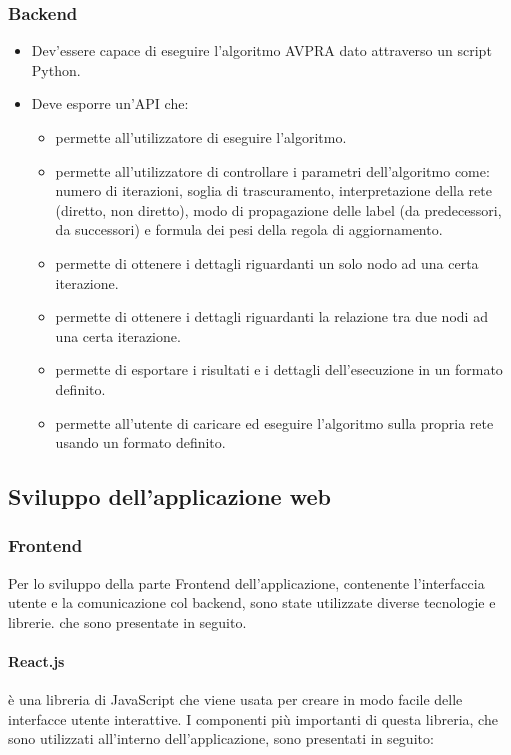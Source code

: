 \documentclass[a4paper,12pt]{report}
\begin{document}
			\subsubsection{Backend}
			\begin{itemize}
				\item Dev'essere capace di eseguire l'algoritmo AVPRA dato attraverso un script Python.
				\item Deve esporre un'API che:
				\begin{itemize}
					\item permette all'utilizzatore di eseguire l'algoritmo.
					\item permette all'utilizzatore di controllare i parametri dell'algoritmo come: numero di iterazioni, soglia di trascuramento, interpretazione della rete (diretto, non diretto), modo di propagazione delle label (da predecessori, da successori) e formula dei pesi della regola di aggiornamento.
					\item permette di ottenere i dettagli riguardanti un solo nodo ad una certa iterazione.
					\item permette di ottenere i dettagli riguardanti la relazione tra due nodi ad una certa iterazione.
					\item permette di esportare i risultati e i dettagli dell'esecuzione in un formato definito.
					\item permette all'utente di caricare ed eseguire l'algoritmo sulla propria rete usando un formato definito.
				\end{itemize}
			\end{itemize}

		\subsection{Sviluppo dell'applicazione web}

			\subsubsection{Frontend}
			Per lo sviluppo della parte Frontend dell'applicazione, contenente l'interfaccia utente e la comunicazione col backend, sono state utilizzate diverse tecnologie e librerie. che sono presentate in seguito.

			\paragraph*{React.js} \par è una libreria di JavaScript che viene usata per creare in modo facile delle interfacce utente interattive. 
				I componenti più importanti di questa libreria, che sono utilizzati all'interno dell'applicazione, sono presentati in seguito:
				
\end{document}
